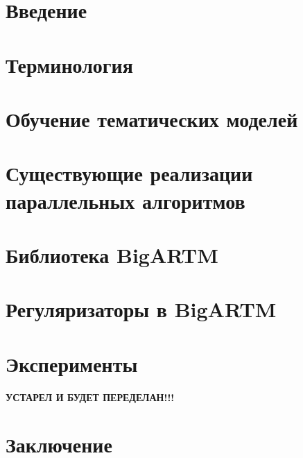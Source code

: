 \documentclass[12pt]{article}
\begin{document}
\tableofcontents
\newpage

\section{Введение}\label{introduction}


\section{Терминология}\label{defenitions}


\section{Обучение тематических моделей}\label{learning}


\section{Существующие реализации параллельных алгоритмов}\label{overview}


\section{Библиотека BigARTM}\label{library}


\section{Регуляризаторы в BigARTM}\label{regularizers}


\section{Эксперименты}\label{experiments}
{\bf УСТАРЕЛ И БУДЕТ ПЕРЕДЕЛАН!!!}



\section{Заключение}\label{results}

\end{document}
